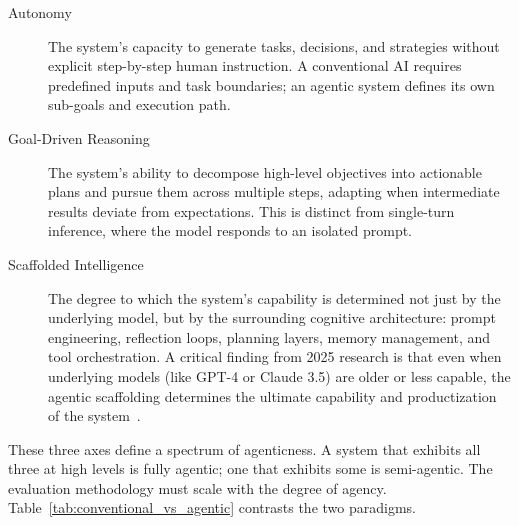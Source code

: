 \documentclass[11pt]{article}
\begin{document}
\begin{description}
    \item[Autonomy] The system's capacity to generate tasks, decisions, and strategies without explicit step-by-step human instruction. A conventional AI requires predefined inputs and task boundaries; an agentic system defines its own sub-goals and execution path.
    \item[Goal-Driven Reasoning] The system's ability to decompose high-level objectives into actionable plans and pursue them across multiple steps, adapting when intermediate results deviate from expectations. This is distinct from single-turn inference, where the model responds to an isolated prompt.
    \item[Scaffolded Intelligence] The degree to which the system's capability is determined not just by the underlying model, but by the surrounding cognitive architecture: prompt engineering, reflection loops, planning layers, memory management, and tool orchestration. A critical finding from 2025 research is that even when underlying models (like GPT-4 or Claude 3.5) are older or less capable, the agentic scaffolding determines the ultimate capability and productization of the system~\citep{beyond_task_completion}.
\end{description}

These three axes define a spectrum of agenticness. A system that exhibits all three at high levels is fully agentic; one that exhibits some is semi-agentic. The evaluation methodology must scale with the degree of agency. Table~\ref{tab:conventional_vs_agentic} contrasts the two paradigms.

\begin{table}[htbp]
\centering
\caption{Conventional AI vs.\ Agentic AI across key dimensions.}
\label{tab:conventional_vs_agentic}
\end{table}
\end{document}

